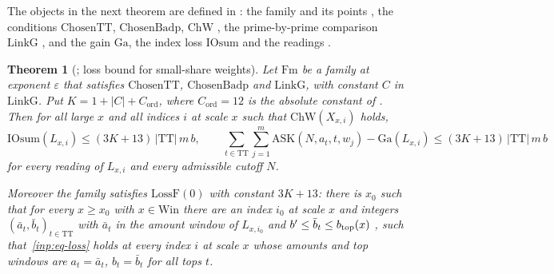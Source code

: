 \documentclass[10pt]{amsart}
\newtheorem{theorem}{Theorem}[section]
\theoremstyle{definition}
\theoremstyle{remark}
\begin{document}
The objects in the next theorem are defined in
\cite[\S\ref{A-i1:ssec-family}]{Annex}: the family and its points
\cite[Definition~\ref{A-i1:def-family-data}]{Annex}, the conditions
$\mathrm{ChosenTT}$, $\mathrm{ChosenBadp}$, $\mathrm{ChW}$
\cite[Definition~\ref{A-i1:def-chosen}]{Annex}, the prime-by-prime
comparison $\mathrm{LinkG}$ \cite[Definition~\ref{A-i1:def-linkG}]{Annex},
and the gain $\mathrm{Ga}$, the index loss $\mathrm{IOsum}$ and the
readings \cite[Definition~\ref{A-i1:def-losses}]{Annex}.

\begin{theorem}[{\cite[Theorem~\ref{A-i1:thm-loss}]{Annex}}; loss bound for small-share weights]\label{inp:thm-loss}
Let $\mathrm{Fm}$ be a family at exponent $\varepsilon$ that satisfies
$\mathrm{ChosenTT}$, $\mathrm{ChosenBadp}$ and $\mathrm{LinkG}$, with constant
$C$ in $\mathrm{LinkG}$. Put $K=1+|C|+C_{\mathrm{ord}}$, where
$C_{\mathrm{ord}}=12$ is the absolute constant of
\cite[Lemma~\ref{A-i1:lem-orders}]{Annex}.
Then for all large $x$ and all indices $i$ at scale $x$ such that
$\mathrm{ChW}(X_{x,i})$ holds,
\begin{equation}\label{inp:eq-loss}
 \mathrm{IOsum}(L_{x,i})\le(3K+13)\,|\mathrm{TT}|\,m\,b,\qquad
 \sum_{t\in\mathrm{TT}}\sum_{j=1}^{m}\mathrm{ASK}(N,a_t,t,w_j)-\mathrm{Ga}(L_{x,i})
 \le(3K+13)\,|\mathrm{TT}|\,m\,b
\end{equation}
for every reading of $L_{x,i}$ and every admissible cutoff $N$.

Moreover the family satisfies $\mathrm{LossF}(0)$ with constant
$3K+13$: there is $x_0$ such that for every $x\ge x_0$ with
$x\in\mathrm{Win}$ there are an index $i_0$ at scale $x$ and integers
$(\bar a_t,\bar b_t)_{t\in\mathrm{TT}}$ with $\bar a_t$ in the amount window
of $L_{x,i_0}$ and $b'\le\bar b_t\le b_{\rm top}(x)$
\cite[Definition~\ref{A-i1:def-family-data}(8)]{Annex}, such
that~\eqref{inp:eq-loss} holds at every index $i$ at scale $x$ whose
amounts and top windows are $a_t=\bar a_t$, $b_t=\bar b_t$ for all tops
$t$.
\end{theorem}
\end{document}
